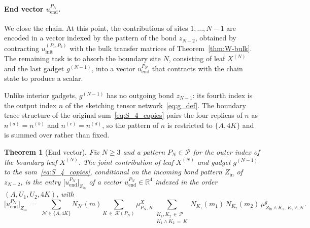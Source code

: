 \documentclass[12pt,a4paper]{article}
\newtheorem{theorem}{Theorem}[section]
\begin{document}
\paragraph{End vector $u^{P_{N}}_{\mathrm{end}}$.}

We close the chain. At this point, the contributions of sites $1, \dots, N-1$ 
are encoded in a vector indexed by the pattern of the bond $z_{N-2}$, obtained 
by contracting $u^{(P_{1}, P_{2})}_{\mathrm{init}}$ with the bulk transfer 
matrices of Theorem~\ref{thm:W-bulk}. The remaining task is to absorb 
the boundary site $N$, consisting of leaf $X^{(N)}$ and the last gadget 
$g^{(N-1)}$, into a vector $u^{P_{N}}_{\mathrm{end}}$ that contracts with 
the chain state to produce a scalar.

Unlike interior gadgets, $g^{(N-1)}$ has no outgoing bond $z_{N-1}$: 
its fourth index is the output index $n$ of the sketching tensor 
network~\eqref{eq:g_def}. The boundary trace structure of the original 
sum~\eqref{eq:S_4_copies} pairs the four replicas of $n$ as 
$n^{(a)} = n^{(b)}$ and $n^{(c)} = n^{(d)}$, so the pattern of $n$ is 
restricted to $\{A, 4K\}$ and is summed over rather than fixed.

\begin{theorem}[End vector]\label{thm:u-end}
Fix $N \ge 3$ and a pattern $P_{N} \in \mathcal{P}$ for the outer index of the boundary leaf $X^{(N)}$. The joint contribution of leaf $X^{(N)}$ and gadget $g^{(N-1)}$ to the sum~\eqref{eq:S_4_copies}, conditional on 
the incoming bond pattern $Z_{\mathrm{in}}$ of $z_{N-2}$, is the entry $\bigl[u^{P_{N}}_{\mathrm{end}}\bigr]_{Z_{\mathrm{in}}}$ of a vector $u^{P_{N}}_{\mathrm{end}} \in \mathbb{R}^{4}$ indexed in the order $(A, U_{1}, U_{2}, 4K)$, with
\begin{equation}\label{eq:u-end}
\bigl[u^{P_{N}}_{\mathrm{end}}\bigr]_{Z_{\mathrm{in}}}
\;=\;
\sum_{\mathcal{N} \in \{A, 4K\}} N_{\mathcal{N}}(m)
\!\!\sum_{K\,\in\, \mathcal{K}(P_{N})}\!\! \mu^{X}_{P_{N}, K}
\!\!\!\!\sum_{\substack{K_{1}, K_{2} \,\in\, \mathcal{P} \\ K_{1} \wedge K_{2} \,=\, K}}\!\!\!\!
N_{K_{1}}(m_{1})\, N_{K_{2}}(m_{2})\,
\mu^{g}_{\,Z_{\mathrm{in}} \wedge K_{1},\, K_{2} \wedge \mathcal{N}}.
\end{equation}
\end{theorem}
\end{document}
